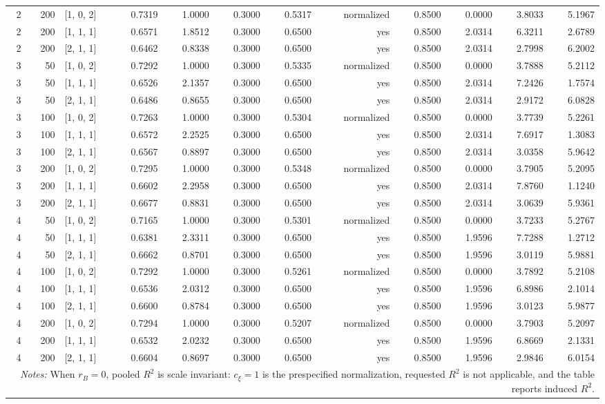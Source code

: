 \begin{longtable}{rrlrrrrrrrrr}
2 & 200 & [1, 0, 2] & 0.7319 & 1.0000 & 0.3000 & 0.5317 & normalized & 0.8500 & 0.0000 & 3.8033 & 5.1967 \\
2 & 200 & [1, 1, 1] & 0.6571 & 1.8512 & 0.3000 & 0.6500 & yes & 0.8500 & 2.0314 & 6.3211 & 2.6789 \\
2 & 200 & [2, 1, 1] & 0.6462 & 0.8338 & 0.3000 & 0.6500 & yes & 0.8500 & 2.0314 & 2.7998 & 6.2002 \\
3 & 50 & [1, 0, 2] & 0.7292 & 1.0000 & 0.3000 & 0.5335 & normalized & 0.8500 & 0.0000 & 3.7888 & 5.2112 \\
3 & 50 & [1, 1, 1] & 0.6526 & 2.1357 & 0.3000 & 0.6500 & yes & 0.8500 & 2.0314 & 7.2426 & 1.7574 \\
3 & 50 & [2, 1, 1] & 0.6486 & 0.8655 & 0.3000 & 0.6500 & yes & 0.8500 & 2.0314 & 2.9172 & 6.0828 \\
3 & 100 & [1, 0, 2] & 0.7263 & 1.0000 & 0.3000 & 0.5304 & normalized & 0.8500 & 0.0000 & 3.7739 & 5.2261 \\
3 & 100 & [1, 1, 1] & 0.6572 & 2.2525 & 0.3000 & 0.6500 & yes & 0.8500 & 2.0314 & 7.6917 & 1.3083 \\
3 & 100 & [2, 1, 1] & 0.6567 & 0.8897 & 0.3000 & 0.6500 & yes & 0.8500 & 2.0314 & 3.0358 & 5.9642 \\
3 & 200 & [1, 0, 2] & 0.7295 & 1.0000 & 0.3000 & 0.5348 & normalized & 0.8500 & 0.0000 & 3.7905 & 5.2095 \\
3 & 200 & [1, 1, 1] & 0.6602 & 2.2958 & 0.3000 & 0.6500 & yes & 0.8500 & 2.0314 & 7.8760 & 1.1240 \\
3 & 200 & [2, 1, 1] & 0.6677 & 0.8831 & 0.3000 & 0.6500 & yes & 0.8500 & 2.0314 & 3.0639 & 5.9361 \\
4 & 50 & [1, 0, 2] & 0.7165 & 1.0000 & 0.3000 & 0.5301 & normalized & 0.8500 & 0.0000 & 3.7233 & 5.2767 \\
4 & 50 & [1, 1, 1] & 0.6381 & 2.3311 & 0.3000 & 0.6500 & yes & 0.8500 & 1.9596 & 7.7288 & 1.2712 \\
4 & 50 & [2, 1, 1] & 0.6662 & 0.8701 & 0.3000 & 0.6500 & yes & 0.8500 & 1.9596 & 3.0119 & 5.9881 \\
4 & 100 & [1, 0, 2] & 0.7292 & 1.0000 & 0.3000 & 0.5261 & normalized & 0.8500 & 0.0000 & 3.7892 & 5.2108 \\
4 & 100 & [1, 1, 1] & 0.6536 & 2.0312 & 0.3000 & 0.6500 & yes & 0.8500 & 1.9596 & 6.8986 & 2.1014 \\
4 & 100 & [2, 1, 1] & 0.6600 & 0.8784 & 0.3000 & 0.6500 & yes & 0.8500 & 1.9596 & 3.0123 & 5.9877 \\
4 & 200 & [1, 0, 2] & 0.7294 & 1.0000 & 0.3000 & 0.5207 & normalized & 0.8500 & 0.0000 & 3.7903 & 5.2097 \\
4 & 200 & [1, 1, 1] & 0.6532 & 2.0232 & 0.3000 & 0.6500 & yes & 0.8500 & 1.9596 & 6.8669 & 2.1331 \\
4 & 200 & [2, 1, 1] & 0.6604 & 0.8697 & 0.3000 & 0.6500 & yes & 0.8500 & 1.9596 & 2.9846 & 6.0154 \\
\bottomrule
\multicolumn{12}{p{0.96\linewidth}}{\footnotesize \textit{Notes:} When $r_B=0$, pooled $R^2$ is scale invariant: $c_\xi=1$ is the prespecified normalization, requested $R^2$ is not applicable, and the table reports induced $R^2$.}
\end{longtable}
\endgroup
